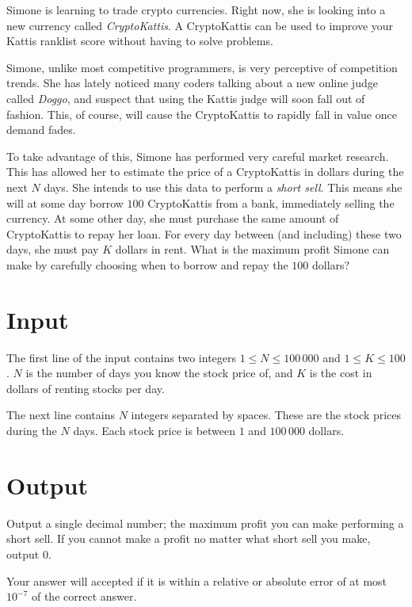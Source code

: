 Simone is learning to trade crypto currencies.
Right now, she is looking into a new currency called \emph{CryptoKattis}.
A CryptoKattis can be used to improve your Kattis ranklist score without having to solve problems.

Simone, unlike most competitive programmers, is very perceptive of competition trends.
She has lately noticed many coders talking about a new online judge called \emph{Doggo}, and suspect that using the Kattis judge will soon fall out of fashion.
This, of course, will cause the CryptoKattis to rapidly fall in value once demand fades.

To take advantage of this, Simone has performed very careful market research.
This has allowed her to estimate the price of a CryptoKattis in dollars during the next $N$ days.
She intends to use this data to perform a \emph{short sell}.
This means she will at some day borrow $100$ CryptoKattis from a bank, immediately selling the currency.
At some other day, she must purchase the same amount of CryptoKattis to repay her loan.
For every day between (and including) these two days, she must pay $K$ dollars in rent.
What is the maximum profit Simone can make by carefully choosing when to borrow and repay the $100$ dollars?

\section*{Input}
The first line of the input contains two integers $1 \le N \le 100\,000$ and $1 \le K \le 100$.
$N$ is the number of days you know the stock price of, and $K$ is the cost in dollars of renting stocks per day.

The next line contains $N$ integers separated by spaces.
These are the stock prices during the $N$ days.
Each stock price is between $1$ and $100\,000$ dollars.

\section*{Output}
Output a single decimal number; the maximum profit you can make performing a short sell.
If you cannot make a profit no matter what short sell you make, output $0$.

Your answer will accepted if it is within a relative or absolute error of at most $10^{-7}$ of the correct answer.

